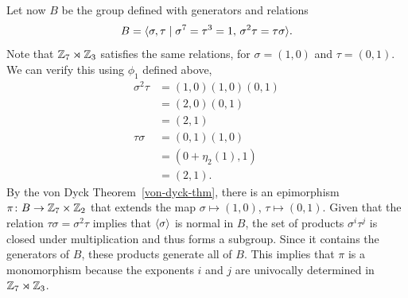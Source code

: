 \begin{xmpl}
    Let now $B$ be the group defined with generators and relations
    $$
        B = \langle\sigma,\tau\mid \sigma^7=\tau^3=1,\,\sigma^2\tau=\tau\sigma\rangle.
    $$
    Note that $\mathbb{Z}_7\rtimes\mathbb{Z}_3$ satisfies the same relations, for $\sigma=(1,0)$ and $\tau=(0,1)$. We can verify this using $\phi_1$ defined above,
    \begin{align*}
        \sigma^2\tau &= (1,0)(1,0)(0,1)\\
            &= (2,0)(0,1)\\
            &= (2,1)\\
        \tau\sigma &= (0,1)(1,0)\\
            &= (0+\eta_2(1),1)\\
            &= (2,1).
    \end{align*}
    By the von Dyck Theorem~\ref{von-dyck-thm}, there is an epimorphism $\pi\colon B\to\mathbb{Z}_7\times\mathbb{Z}_2$ that extends the map $\sigma\mapsto(1,0)$, $\tau\mapsto(0,1)$. Given that the relation $\tau\sigma = \sigma^2\tau$ implies that $\langle\sigma\rangle$ is normal in $B$, the set of products $\sigma^i\tau^j$ is closed under multiplication and thus forms a subgroup. Since it contains the generators of $B$, these products generate all of $B$. This implies that $\pi$ is a monomorphism because the exponents $i$ and $j$ are univocally determined in $\mathbb{Z}_7\rtimes\mathbb{Z}_3$.
\end{xmpl}

